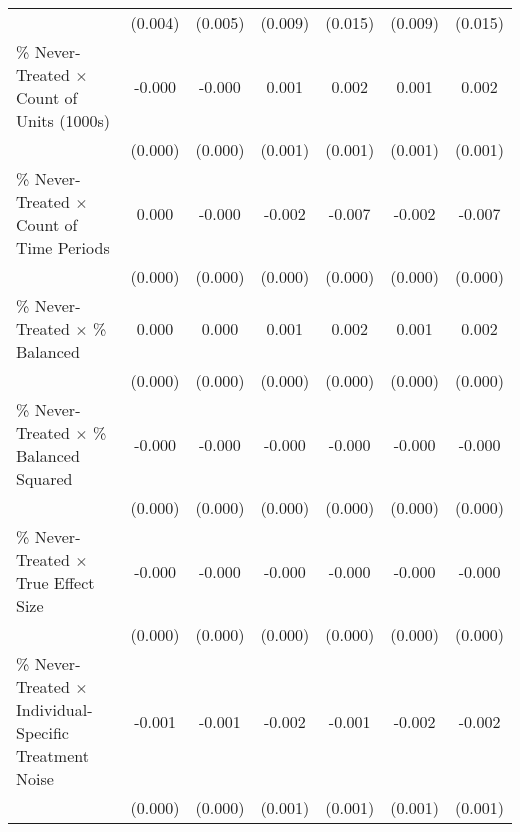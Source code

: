 \begin{table}[htbp]
\begin{tabular}{l*{6}{c}}
                    &     (0.004)         &     (0.005)         &     (0.009)         &     (0.015)         &     (0.009)         &     (0.015)         \\
\% Never-Treated $\times$ Count of Units (1000s)&      -0.000         &      -0.000         &       0.001         &       0.002         &       0.001         &       0.002         \\
                    &     (0.000)         &     (0.000)         &     (0.001)         &     (0.001)         &     (0.001)         &     (0.001)         \\
\% Never-Treated $\times$ Count of Time Periods&       0.000         &      -0.000         &      -0.002\sym{***}&      -0.007\sym{***}&      -0.002\sym{***}&      -0.007\sym{***}\\
                    &     (0.000)         &     (0.000)         &     (0.000)         &     (0.000)         &     (0.000)         &     (0.000)         \\
\% Never-Treated $\times$ \% Balanced&       0.000\sym{***}&       0.000\sym{***}&       0.001\sym{***}&       0.002\sym{***}&       0.001\sym{***}&       0.002\sym{***}\\
                    &     (0.000)         &     (0.000)         &     (0.000)         &     (0.000)         &     (0.000)         &     (0.000)         \\
\% Never-Treated $\times$ \% Balanced Squared&      -0.000\sym{***}&      -0.000\sym{***}&      -0.000\sym{***}&      -0.000\sym{***}&      -0.000\sym{***}&      -0.000\sym{***}\\
                    &     (0.000)         &     (0.000)         &     (0.000)         &     (0.000)         &     (0.000)         &     (0.000)         \\
\% Never-Treated $\times$ True Effect Size&      -0.000         &      -0.000         &      -0.000         &      -0.000\sym{*}  &      -0.000         &      -0.000\sym{*}  \\
                    &     (0.000)         &     (0.000)         &     (0.000)         &     (0.000)         &     (0.000)         &     (0.000)         \\
\% Never-Treated $\times$ Individual-Specific Treatment Noise&      -0.001\sym{*}  &      -0.001\sym{*}  &      -0.002\sym{*}  &      -0.001         &      -0.002\sym{*}  &      -0.002         \\
                    &     (0.000)         &     (0.000)         &     (0.001)         &     (0.001)         &     (0.001)         &     (0.001)         \\

\end{tabular}
\end{table}
